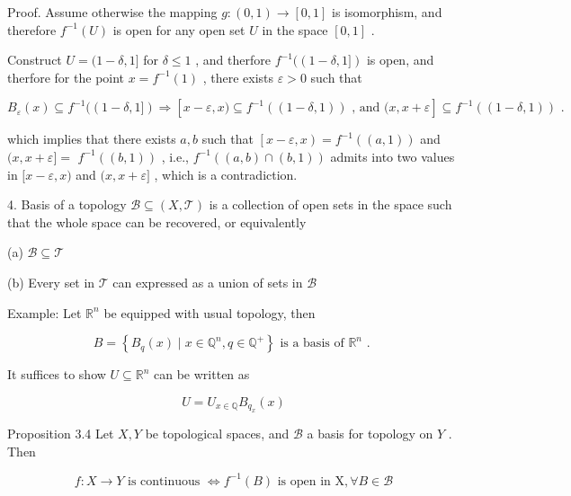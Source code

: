 Proof. Assume otherwise the mapping \(g : \left( {0,1}\right)  \rightarrow  \left\lbrack  {0,1}\right\rbrack\) is isomorphism, and therefore \({f}^{-1}\left( U\right)\) is open for any open set \(U\) in the space \(\left\lbrack  {0,1}\right\rbrack\) .

Construct \(U = (1 - \delta ,1\rbrack\) for \(\delta  \leq  1\) , and therfore \({f}^{-1}(\left( {1 - \delta ,1\rbrack }\right)\) is open, and therfore for the point \(x = {f}^{-1}\left( 1\right)\) , there exists \(\varepsilon  > 0\) such that

\[
{B}_{\varepsilon }\left( x\right)  \subseteq  {f}^{-1}(\left( {1 - \delta ,1\rbrack }\right)  \Rightarrow  \left\lbrack  {x - \varepsilon ,x) \subseteq  {f}^{-1}\left( \left( {1 - \delta ,1}\right) \right) \text{ , and }(x,x + \varepsilon }\right\rbrack   \subseteq  {f}^{-1}\left( \left( {1 - \delta ,1}\right) \right) \text{ . }
\]

which implies that there exists \(a,b\) such that \(\left\lbrack  {x - \varepsilon ,x}\right)  = {f}^{-1}\left( \left( {a,1}\right) \right)\) and \((x,x + \varepsilon \rbrack  =\)  \({f}^{-1}\left( \left( {b,1}\right) \right)\) , i.e., \({f}^{-1}\left( {\left( {a,b}\right)  \cap  \left( {b,1}\right) }\right)\) admits into two values in \(\lbrack x - \varepsilon ,x)\) and \((x,x + \varepsilon \rbrack\) , which is a contradiction.

4. Basis of a topology \(\mathcal{B} \subseteq  \left( {X,\mathcal{T}}\right)\) is a collection of open sets in the space such that the whole space can be recovered, or equivalently

(a) \(\mathcal{B} \subseteq  \mathcal{T}\)

(b) Every set in \(\mathcal{T}\) can expressed as a union of sets in \(\mathcal{B}\)

Example: Let \({\mathbb{R}}^{n}\) be equipped with usual topology, then

\[
B = \left\{  {{B}_{q}\left( x\right)  \mid  x \in  {\mathbb{Q}}^{n},q \in  {\mathbb{Q}}^{ + }}\right\}  \text{ is a basis of }{\mathbb{R}}^{n}\text{ . }
\]

It suffices to show \(U \subseteq  {\mathbb{R}}^{n}\) can be written as

\[
U = {U}_{x \in  \mathbb{Q}}{B}_{{q}_{x}}\left( x\right)
\]

Proposition 3.4 Let \(X,Y\) be topological spaces, and \(\mathcal{B}\) a basis for topology on \(Y\) . Then

\[
f : X \rightarrow  Y\text{ is continuous } \Leftrightarrow  {f}^{-1}\left( B\right) \text{ is open in }\mathrm{X},\forall B \in  \mathcal{B}
\]

